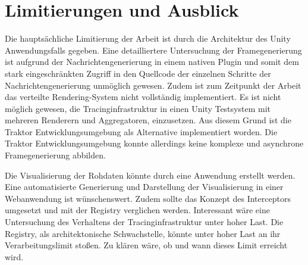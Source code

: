 \section{Limitierungen und Ausblick}
\label{section:Limitierungen und Ausblick}
Die hauptsächliche Limitierung der Arbeit ist durch die Architektur des Unity Anwendungsfalls gegeben. Eine detailliertere Untersuchung der Framegenerierung ist aufgrund der Nachrichtengenerierung in einem nativen Plugin und somit dem stark eingeschränkten Zugriff in den Quellcode der einzelnen Schritte der Nachrichtengenerierung unmöglich gewesen. Zudem ist zum Zeitpunkt der Arbeit das verteilte Rendering-System nicht vollständig implementiert. Es ist nicht möglich gewesen, die Tracinginfrastruktur in einen Unity Testsystem  mit mehreren Renderern und Aggregatoren, einzusetzen. Aus diesem Grund ist die Traktor Entwicklungsumgebung als Alternative implementiert worden. Die Traktor Entwicklungsumgebung konnte allerdings keine komplexe und asynchrone Framegenerierung abbilden. 

Die Visualisierung der Rohdaten könnte durch eine Anwendung erstellt werden. Eine automatisierte Generierung und Darstellung der Visualisierung in einer Webanwendung ist wünschenswert. Zudem sollte das Konzept des Interceptors umgesetzt und mit der Registry verglichen werden. Interessant wäre eine Untersuchung des Verhaltens der Tracinginfrastruktur unter hoher Last. Die Registry, als architektonische Schwachstelle, könnte unter hoher Last an ihr Verarbeitungslimit stoßen. Zu klären wäre, ob und wann dieses Limit erreicht wird.

 

